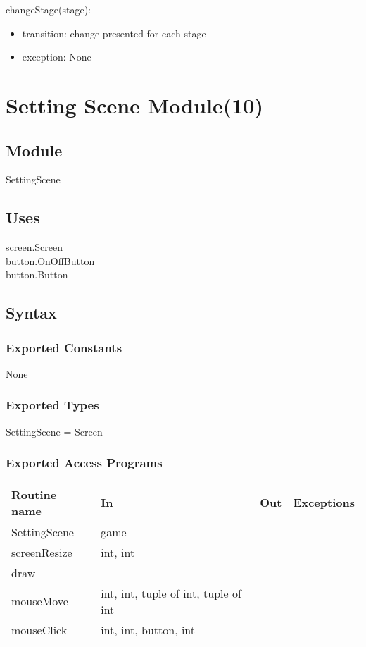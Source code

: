 \documentclass{article}
\begin{document}
\noindent changeStage(stage):
\begin{itemize}
\item transition: change presented for each stage
\item exception: None
\end{itemize}\vspace{6mm}
\newpage


\section {Setting Scene Module(10)}

\subsection{Module}
SettingScene

\subsection {Uses}
screen.Screen\\
button.OnOffButton\\
button.Button

\subsection {Syntax}

\subsubsection {Exported Constants}
None

\subsubsection {Exported Types}
SettingScene = Screen

\subsubsection {Exported Access Programs}
\begin{table}[!htbp]
\begin{tabular}{| l | l | l | l |}
\hline
\textbf{Routine name} & \textbf{In} & \textbf{Out} & \textbf{Exceptions}\\
\hline
SettingScene & game & ~ & ~\\
\hline
screenResize & int, int & ~& ~\\
\hline
draw & ~ & ~& ~\\
\hline
mouseMove & int, int, tuple of int, tuple of int & ~& ~\\
\hline
mouseClick & int, int, button, int & ~& ~\\
\hline


\end{tabular}

\end{table}
\FloatBarrier
\end{document}
